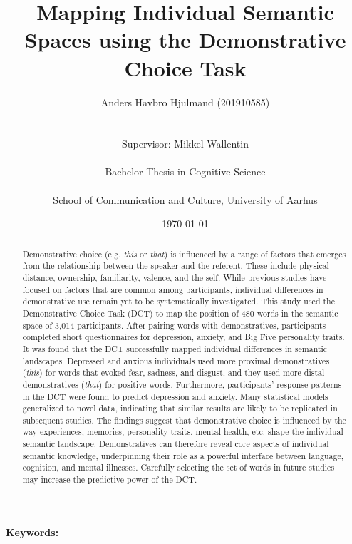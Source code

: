 \documentclass[11pt, a4paper]{article}
\title{Mapping Individual Semantic Spaces using the Demonstrative Choice Task} \\ \\
\author{Anders Havbro Hjulmand (201910585)\\ \\ \\
Supervisor: Mikkel Wallentin\\ \\ 
Bachelor Thesis in Cognitive Science\\ \\
School of Communication and Culture, University of Aarhus}
\date{\today}
\begin{document}
\maketitle

\begin{abstract}
Demonstrative choice (e.g. \textit{this} or \textit{that}) is influenced by a range of factors that emerges from the relationship between the speaker and the referent. These include physical distance, ownership, familiarity, valence, and the self. While previous studies have focused on factors that are common among participants, individual differences in demonstrative use remain yet to be systematically investigated. This study used the Demonstrative Choice Task (DCT) to map the position of 480 words in the semantic space of 3,014 participants. After pairing words with demonstratives, participants completed short questionnaires for depression, anxiety, and Big Five personality traits. It was found that the DCT successfully mapped individual differences in semantic landscapes. Depressed and anxious individuals used more proximal demonstratives (\textit{this}) for words that evoked fear, sadness, and disgust, and they used more distal demonstratives (\textit{that}) for positive words. Furthermore, participants’ response patterns in the DCT were found to predict depression and anxiety. Many statistical models generalized to novel data, indicating that similar results are likely to be replicated in subsequent studies. The findings suggest that demonstrative choice is influenced by the way experiences, memories, personality traits, mental health, etc. shape the individual semantic landscape. Demonstratives can therefore reveal core aspects of individual semantic knowledge, underpinning their role as a powerful interface between language, cognition, and mental illnesses. Carefully selecting the set of words in future studies may increase the predictive power of the DCT. 
\end{abstract}

\textbf{Keywords:} 
\\ \\

\\


\newpage

\tableofcontents
\end{document}
